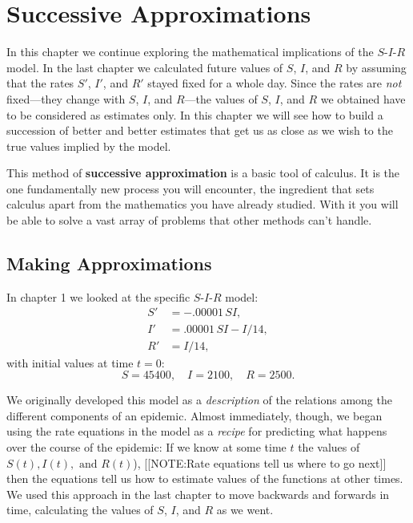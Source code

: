 

\chapter{Successive Approximations}
\label{chap:successive-approximations}


In this chapter we continue exploring the mathematical implications of
the $S$-$I$-$R$ model.  In the last chapter we calculated future
values of $S$, $I$, and $R$ by assuming that the rates $S'$, $I'$, and
$R'$ stayed fixed for a whole day.  Since the rates are {\em not\/}
fixed---they change with $S$, $I$, and $R$---the values of $S$, $I$,
and $R$ we obtained have to be considered as estimates only.  In this
chapter we will see how to build a succession of better and better
estimates that get us as close as we wish to the true values implied
by the model.

This method of {\bf successive approximation} is a basic tool of
calculus.  It is the one fundamentally new process you will encounter,
the ingredient that sets calculus apart from the mathematics you have
already studied.  With it you will be able to solve a vast array of
problems that other methods can't handle.


\section{Making Approximations}
\label{sec:making-approximations}

In chapter 1 we looked at the specific $S$-$I$-$R$ model:
\begin{align*}
S' &= -.00001 \, SI, \\
I' &= .00001 \, SI - I/14, \\
R' &= I/14,
\end{align*}
with initial values at time $t = 0$:  
\[
S = 45400,  \quad I = 2100, \quad R = 2500.
\]

We originally developed this model as a {\em description} of the
relations among the different components of an epidemic.  Almost
immediately, though, we began using the rate equations in the model as
a {\em recipe} for predicting what happens over the course of the
epidemic: If we know at some time $t$ the values of $S(t), I(t),
\mbox{ and } R(t)$), [[NOTE:Rate equations tell us where to go next]]
then the equations tell us how to estimate values of the functions at
other times. We used this approach in the last chapter to move
backwards and forwards in time, calculating the values of $S$, $I$,
and $R$ as we went.

